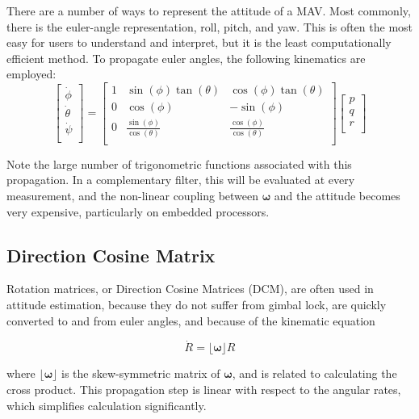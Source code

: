\documentclass[paper=a4, fontsize=11pt]{scrartcl} %
\numberwithin{equation}{section} %
\numberwithin{figure}{section} %
\numberwithin{table}{section} %
\begin{document}
There are a number of ways to represent the attitude of a MAV.  Most commonly, there is the euler-angle representation, roll, pitch, and yaw.  This is often the most easy for users to understand and interpret, but it is the least computationally efficient method.  To propagate euler angles, the following kinematics are employed:
\begin{equation}
	\begin{bmatrix}
		\dot{\phi} \\
		\dot{\theta} \\
		\dot{\psi} \\
	\end{bmatrix}
	= 
	\begin{bmatrix}
		1 & \sin(\phi) \tan(\theta) & \cos(\phi)\tan(\theta) \\
		0 & \cos(\phi)              & -\sin(\phi) \\
		0 & \frac{\sin(\phi)}{\cos(\theta)} & \frac{\cos(\phi)}{\cos(\theta)}  \\
	\end{bmatrix}
	\begin{bmatrix}
		p \\
		q \\
		r \\
	\end{bmatrix}
\end{equation}

Note the large number of trigonometric functions associated with this propagation.  In a complementary filter, this will be evaluated at every measurement, and the non-linear coupling between $\bm{\omega}$  and the attitude becomes very expensive, particularly on embedded processors.

\subsection{Direction Cosine Matrix}

Rotation matrices, or Direction Cosine Matrices (DCM), are often used in attitude estimation, because they do not suffer from gimbal lock, are quickly converted to and from euler angles, and because of the kinematic equation

\begin{equation}
	\dot{R} = \lfloor\bm{\omega}\rfloor R
\end{equation}

where $\lfloor \bm{\omega} \rfloor$ is the skew-symmetric matrix of $\bm{\omega}$, and is related to calculating the cross product.  This propagation step is linear with respect to the angular rates, which simplifies calculation significantly.
\end{document}
